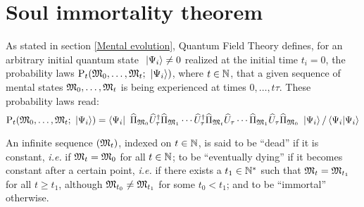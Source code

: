 


\section{Soul immortality theorem}

 As stated in section \ref{Mental evolution}, Quantum Field Theory defines, for an arbitrary initial quantum state $\ \left|{\Psi_i}\right\rangle \neq 0$ realized at the initial time $t_i = 0$, the probability laws $\mathrm P_t(\mathfrak{M}_0, \dotsc, \mathfrak{M}_t; \ \left|{\Psi_i}\right\rangle)$, where $t \in \mathbb{N}$, that a given sequence of mental states $\mathfrak{M}_0, \dotsc, \mathfrak{M}_t$ is being experienced at times $0, \dotsc, t \tau$. These probability laws read:
\begin{equation*}
\mathrm P_t(\mathfrak{M}_0, \dotsc, \mathfrak{M}_t; \ \left|{\Psi_i}\right\rangle) = \left\langle{\Psi_i}\right|\  \widehat{\Pi}_{\mathfrak{M}_0} \widehat{U}^{\dagger}_\tau \widehat{\Pi}_{\mathfrak{M}_1} \dotsm \widehat{U}^{\dagger}_\tau \widehat{\Pi}_{\mathfrak{M}_t} \widehat{U}_\tau \dotsm \widehat{\Pi}_{\mathfrak{M}_1} \widehat{U}_\tau \widehat{\Pi}_{\mathfrak{M}_0} \ \left|{\Psi_i}\right\rangle / \left\langle{\Psi_i}|{\Psi_i}\right\rangle
\end{equation*}

 An infinite sequence $(\mathfrak{M}_t)$, indexed on $t \in \mathbb{N}$, is said to be ``dead'' if it is constant, \textit{i.e.} if $\mathfrak{M}_t = \mathfrak{M}_0$ for all $t \in \mathbb{N}$; to be ``eventually dying'' if it becomes constant after a certain point, \textit{i.e.} if there exists a $t_1 \in \mathbb{N}^*$ such that $\mathfrak{M}_t = \mathfrak{M}_{t_1}$ for all $t \geq t_1$, although $\mathfrak{M}_{t_0} \neq \mathfrak{M}_{t_1}$ for some $t_0 < t_1$; and to be ``immortal'' otherwise.

